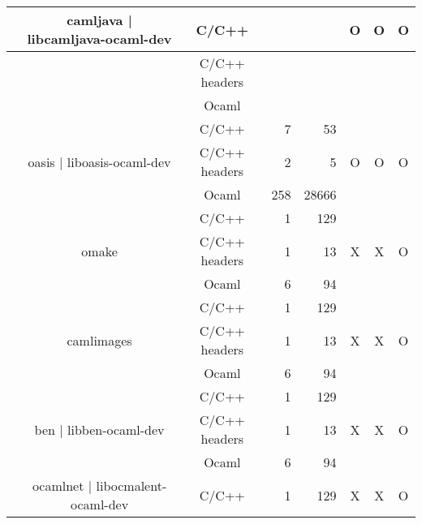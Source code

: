 \documentclass[11pt,a4paper]{article}
\begin{document}
\begin{table}[h,t]
\begin{tabular}{|>{\centering}m{3cm}| c|c|r|r| c| c|c|}
  & \multirow{3}{3cm}{camljava | libcamljava-ocaml-dev} & C/C++ &  &  & \multirow{3}{*}{O} & \multirow{3}{*}{O} & \multirow{3}{*}{O}\\
 \cline{3-5}
 & &                           C/C++ headers & &  & & & \\
 \cline{3-5}
 & &                          Ocaml & &  & & & \\
 \cline{2-8}



&\multirow{3}{3cm}{oasis | liboasis-ocaml-dev} & C/C++ &  7& 53 & \multirow{3}{*}{O} & \multirow{3}{*}{O} & \multirow{3}{*}{O}\\
 \cline{3-5}
 & &                           C/C++ headers & 2 & 5 & & & \\
 \cline{3-5}
 & &                          Ocaml & 258& 28666 & & & \\
 \cline{2-8}


 &\multirow{3}{3cm}{omake} & C/C++ & 1 & 129 & \multirow{3}{*}{X} & \multirow{3}{*}{X} & \multirow{3}{*}{O}\\

\cline{3-5}
& &                           C/C++ headers & 1 & 13 & & & \\
\cline{3-5}
& &                          Ocaml & 6 & 94 & & & \\
\cline{2-8}




 &\multirow{3}{3cm}{camlimages} & C/C++ & 1 & 129 & \multirow{3}{*}{X} & \multirow{3}{*}{X} & \multirow{3}{*}{O}\\

\cline{3-5}
& &                           C/C++ headers & 1 & 13 & & & \\
\cline{3-5}
& &                          Ocaml & 6 & 94 & & & \\
\cline{2-8}



 &\multirow{3}{3cm}{ben | libben-ocaml-dev} & C/C++ & 1 & 129 & \multirow{3}{*}{X} & \multirow{3}{*}{X} & \multirow{3}{*}{O}\\

\cline{3-5}
& &                           C/C++ headers & 1 & 13 & & & \\
\cline{3-5}
& &                          Ocaml & 6 & 94 & & & \\
\cline{2-8}



 &\multirow{3}{3cm}{ocamlnet | libocmalent-ocaml-dev} & C/C++ & 1 & 129 & \multirow{3}{*}{X} & \multirow{3}{*}{X} & \multirow{3}{*}{O}\\


\end{tabular}
\end{table}
\end{document}
